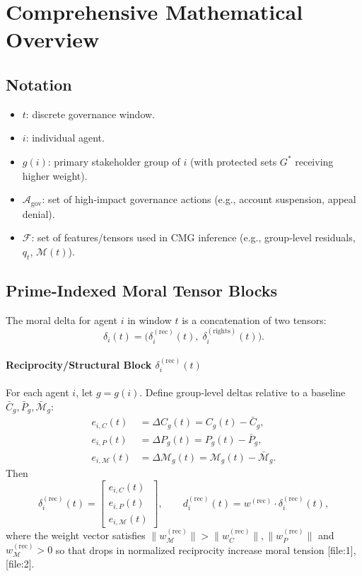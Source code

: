\documentclass[11pt]{article}
\begin{document}
\section{Comprehensive Mathematical Overview}
\subsection{Notation}
\begin{itemize}
  \item $t$: discrete governance window.
  \item $i$: individual agent.
  \item $g(i)$: primary stakeholder group of $i$ (with protected sets $G^*$ receiving higher weight).
  \item $\mathcal{A}_{\text{gov}}$: set of high‑impact governance actions (e.g., account suspension, appeal denial).
  \item $\mathcal{F}$: set of features/tensors used in CMG inference (e.g., group‑level residuals, $q_t$, $\mathcal{M}(t)$).
\end{itemize}

\subsection{Prime‑Indexed Moral Tensor Blocks}
The moral delta for agent $i$ in window $t$ is a concatenation of two tensors:
\begin{equation}
  \delta_i(t) = \big( \delta_i^{(\text{rec})}(t),\; \delta_i^{(\text{rights})}(t) \big).
\end{equation}

\paragraph{Reciprocity/Structural Block $\delta_i^{(\text{rec})}(t)$}
For each agent $i$, let $g=g(i)$. Define group‑level deltas relative to a baseline $\bar{C}_g,\bar{P}_g,\bar{\mathcal{M}}_g$:
\begin{align}
  e_{i,C}(t) &= \Delta C_g(t) = C_g(t) - \bar{C}_g,\\
  e_{i,P}(t) &= \Delta P_g(t) = P_g(t) - \bar{P}_g,\\
  e_{i,\mathcal{M}}(t) &= \Delta \mathcal{M}_g(t) = \mathcal{M}_g(t) - \bar{\mathcal{M}}_g.
\end{align}
Then
\begin{equation}
  \delta_i^{(\text{rec})}(t) = \begin{bmatrix} e_{i,C}(t) \\ e_{i,P}(t) \\ e_{i,\mathcal{M}}(t) \end{bmatrix},\qquad
  d_i^{(\text{rec})}(t) = w^{(\text{rec})}\cdot\delta_i^{(\text{rec})}(t),
\end{equation}
where the weight vector satisfies $\|w_{\mathcal{M}}^{(\text{rec})}\| > \|w_C^{(\text{rec})}\|,\|w_P^{(\text{rec})}\|$ and $w_{\mathcal{M}}^{(\text{rec})}>0$ so that drops in normalized reciprocity increase moral tension {[file:1],[file:2]}.
\end{document}
